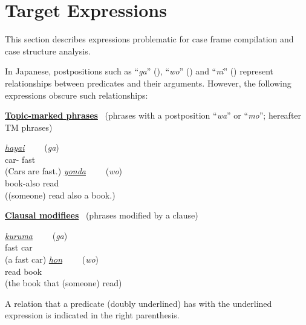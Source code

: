 \documentclass[english]{jnlp_1.4_rep}
\newcommand{\nom}{}
\newcommand{\acc}{}
\newcommand{\dat}{}
\newcommand{\TOP}{}
\begin{document}
\section{Target Expressions}
\label{章::日本語表現}

This section describes expressions problematic for case frame
compilation and case structure analysis.

In Japanese, postpositions such as ``\textit{ga}'' (\nom), ``\textit{wo}'' (\acc) and
``\textit{ni}'' (\dat) represent relationships between predicates and their
arguments. However, the following expressions obscure such relationships:


\noindent
\underline{\textbf{Topic-marked phrases}} \ (phrases with a postposition
``\textit{wa}'' or ``\textit{mo}''; hereafter TM phrases)

\begin{exe}
\ex
 \begin{xlist}
 \ex
   {\textit{\underline{\underline{hayai}}}} {\ \ \ \ (\textit{ga})} \\
       {car-\TOP} {fast} \\
  \trans (Cars are fast.)
 \ex
   {\textit{\underline{\underline{yonda}}}} {\ \ \ \ (\textit{wo})} \\
       {book-also} {read} \\
  \trans ((someone) read also a book.)
 \end{xlist}
\end{exe}

\noindent
\underline{\textbf{Clausal modifiees}} \ (phrases modified by a clause)

\begin{exe}
\ex
 \begin{xlist}
 \ex
   {\textit{\underline{kuruma\vphantom{y}}}} {\ \ \ \ (\textit{ga})} \\
       {fast} {car} \\
  \trans (a fast car)
 \ex
   {\textit{\underline{hon\vphantom{y}}}} {\ \ \ \ (\textit{wo})} \\
       {read} {book} \\
  \trans (the book that (someone) read)
 \end{xlist}
\end{exe}
A relation that a predicate (doubly underlined) has with the underlined expression is
indicated in the right parenthesis.
\end{document}

